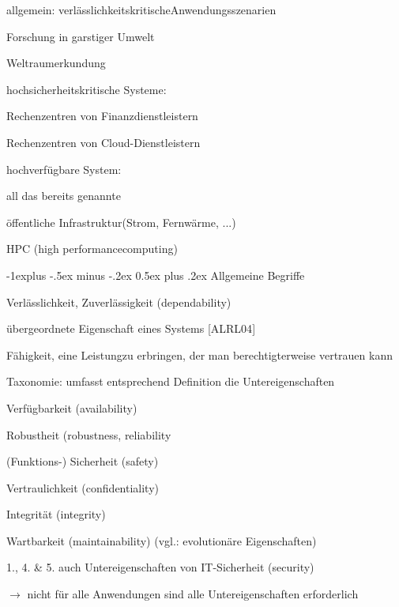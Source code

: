 \documentclass[a4paper]{article}
\makeatletter
\renewcommand{\subsection}{\@startsection{subsection}{2}{0mm}%
 {-1explus -.5ex minus -.2ex}%
 {0.5ex plus .2ex}%
 {\normalfont\normalsize\bfseries}}
\makeatother
\begin{document}
\begin{multicols}{3}
    \begin{itemize*}
        \item
        allgemein: verlässlichkeitskritischeAnwendungsszenarien
        \item
        Forschung in garstiger Umwelt
        \item
        Weltraumerkundung
        \item
        hochsicherheitskritische Systeme:
        \begin{itemize*}
            \item Rechenzentren von Finanzdienstleistern
            \item Rechenzentren von Cloud-Dienstleistern
        \end{itemize*}
        \item
        hochverfügbare System:
        \begin{itemize*}
            \item all das bereits genannte
            \item öffentliche Infrastruktur(Strom, Fernwärme, ...)
        \end{itemize*}
        \item
        HPC (high performancecomputing)
    \end{itemize*}


    \subsection{Allgemeine Begriffe}

    \begin{itemize*}
        \item
        Verlässlichkeit, Zuverlässigkeit (dependability)
        \item
        übergeordnete Eigenschaft eines Systems {[}ALRL04{]}
        \item
        Fähigkeit, eine Leistungzu erbringen, der man berechtigterweise
        vertrauen kann
        \item
        Taxonomie: umfasst entsprechend Definition die Untereigenschaften
        \begin{enumerate*}

            \item Verfügbarkeit (availability)
            \item Robustheit (robustness, reliability
            \item (Funktions-) Sicherheit (safety)
            \item Vertraulichkeit (confidentiality)
            \item Integrität (integrity)
            \item Wartbarkeit (maintainability) (vgl.: evolutionäre Eigenschaften)
        \end{enumerate*}
        \item
        1., 4. \& 5. auch Untereigenschaften von IT-Sicherheit (security)
        \item
        $\rightarrow$ nicht für alle Anwendungen sind alle
        Untereigenschaften erforderlich
    \end{itemize*}



\end{multicols}
\end{document}
